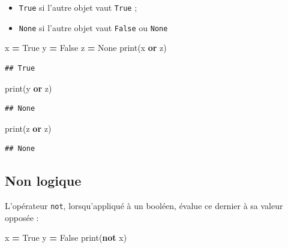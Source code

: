 \documentclass[
  12pt,
]{book}
\newenvironment{Shaded}{\begin{snugshade}}{\end{snugshade}}
\newcommand{\BuiltInTok}[1]{#1}
\newcommand{\KeywordTok}[1]{\textcolor[rgb]{0.13,0.29,0.53}{\textbf{#1}}}
\newcommand{\NormalTok}[1]{#1}
\newcommand{\OperatorTok}[1]{\textcolor[rgb]{0.81,0.36,0.00}{\textbf{#1}}}
\newcommand{\VariableTok}[1]{\textcolor[rgb]{0.00,0.00,0.00}{#1}}
\providecommand{\tightlist}{%
  \setlength{\itemsep}{0pt}\setlength{\parskip}{0pt}}
\numberwithin{equation}{section}
\numberwithin{countremarque}{section}
\begin{document}
\begin{itemize}
\tightlist
\item
  \texttt{True} si l'autre objet vaut \texttt{True} ;
\item
  \texttt{None} si l'autre objet vaut \texttt{False} ou \texttt{None}
\end{itemize}

\begin{Shaded}
\begin{Highlighting}[]
\NormalTok{x }\OperatorTok{=} \VariableTok{True}
\NormalTok{y }\OperatorTok{=} \VariableTok{False}
\NormalTok{z }\OperatorTok{=} \VariableTok{None}
\BuiltInTok{print}\NormalTok{(x }\KeywordTok{or}\NormalTok{ z)}
\end{Highlighting}
\end{Shaded}

\begin{lstlisting}
## True
\end{lstlisting}

\begin{Shaded}
\begin{Highlighting}[]
\BuiltInTok{print}\NormalTok{(y }\KeywordTok{or}\NormalTok{ z)}
\end{Highlighting}
\end{Shaded}

\begin{lstlisting}
## None
\end{lstlisting}

\begin{Shaded}
\begin{Highlighting}[]
\BuiltInTok{print}\NormalTok{(z }\KeywordTok{or}\NormalTok{ z)}
\end{Highlighting}
\end{Shaded}

\begin{lstlisting}
## None
\end{lstlisting}

\subsection{Non logique}\label{non-logique}

L'opérateur \texttt{not}, lorsqu'appliqué à un booléen, évalue ce dernier à sa valeur opposée :

\begin{Shaded}
\begin{Highlighting}[]
\NormalTok{x }\OperatorTok{=} \VariableTok{True}
\NormalTok{y }\OperatorTok{=} \VariableTok{False}
\BuiltInTok{print}\NormalTok{(}\KeywordTok{not}\NormalTok{ x)}
\end{Highlighting}
\end{Shaded}
\end{document}
